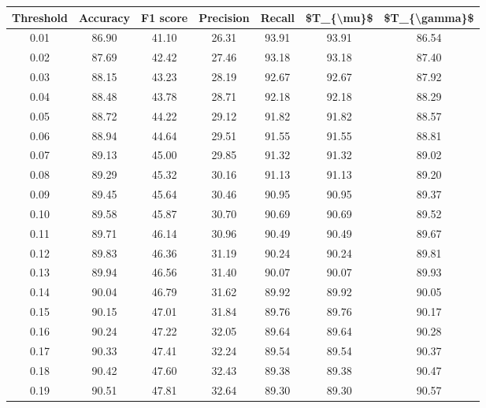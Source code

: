 \begin{tabular}{|c|c|c|c|c|c|c|}
\hline
 Threshold &  Accuracy &  F1 score &  Precision &  Recall &  \$T\_\{\textbackslash mu\}\$ &  \$T\_\{\textbackslash gamma\}\$ \\
\hline
      0.01 &     86.90 &     41.10 &      26.31 &   93.91 &      93.91 &         86.54 \\
      0.02 &     87.69 &     42.42 &      27.46 &   93.18 &      93.18 &         87.40 \\
      0.03 &     88.15 &     43.23 &      28.19 &   92.67 &      92.67 &         87.92 \\
      0.04 &     88.48 &     43.78 &      28.71 &   92.18 &      92.18 &         88.29 \\
      0.05 &     88.72 &     44.22 &      29.12 &   91.82 &      91.82 &         88.57 \\
      0.06 &     88.94 &     44.64 &      29.51 &   91.55 &      91.55 &         88.81 \\
      0.07 &     89.13 &     45.00 &      29.85 &   91.32 &      91.32 &         89.02 \\
      0.08 &     89.29 &     45.32 &      30.16 &   91.13 &      91.13 &         89.20 \\
      0.09 &     89.45 &     45.64 &      30.46 &   90.95 &      90.95 &         89.37 \\
      0.10 &     89.58 &     45.87 &      30.70 &   90.69 &      90.69 &         89.52 \\
      0.11 &     89.71 &     46.14 &      30.96 &   90.49 &      90.49 &         89.67 \\
      0.12 &     89.83 &     46.36 &      31.19 &   90.24 &      90.24 &         89.81 \\
      0.13 &     89.94 &     46.56 &      31.40 &   90.07 &      90.07 &         89.93 \\
      0.14 &     90.04 &     46.79 &      31.62 &   89.92 &      89.92 &         90.05 \\
      0.15 &     90.15 &     47.01 &      31.84 &   89.76 &      89.76 &         90.17 \\
      0.16 &     90.24 &     47.22 &      32.05 &   89.64 &      89.64 &         90.28 \\
      0.17 &     90.33 &     47.41 &      32.24 &   89.54 &      89.54 &         90.37 \\
      0.18 &     90.42 &     47.60 &      32.43 &   89.38 &      89.38 &         90.47 \\
      0.19 &     90.51 &     47.81 &      32.64 &   89.30 &      89.30 &         90.57 \\

\end{tabular}

